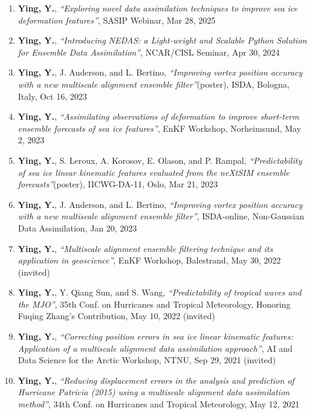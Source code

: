 \begin{enumerate}
\item \textbf{Ying, Y.},
\textit{``Exploring novel data assimilation techniques to improve sea ice deformation features''},
SASIP Webinar, Mar 28, 2025

\item \textbf{Ying, Y.},
\textit{``Introducing NEDAS: a Light-weight and Scalable Python Solution for Ensemble Data Assimilation''},
NCAR/CISL Seminar, Apr 30, 2024

\item \textbf{Ying, Y.}, J. Anderson, and L. Bertino,
\textit{``Improving vortex position accuracy with a new multiscale alignment ensemble filter''}(poster),
ISDA, Bologna, Italy, Oct 16, 2023

\item \textbf{Ying, Y.},
\textit{``Assimilating observations of deformation to improve short-term ensemble forecasts of sea ice features''},
EnKF Workshop, Norheimsund, May 2, 2023

\item \textbf{Ying, Y.}, S. Leroux, A. Korosov, E. Olason, and P. Rampal,
\textit{``Predictability of sea ice linear kinematic features evaluated from the neXtSIM ensemble forecasts''}(poster),
IICWG-DA-11, Oslo, Mar 21, 2023

\item \textbf{Ying, Y.}, J. Anderson, and L. Bertino,
\textit{``Improving vortex position accuracy with a new multiscale alignment ensemble filter''},
ISDA-online, Non-Gaussian Data Assimilation, Jan 20, 2023

\item \textbf{Ying, Y.},
\textit{``Multiscale alignment ensemble filtering technique and its application in geoscience''},
EnKF Workshop, Balestrand, May 30, 2022
(invited)

\item \textbf{Ying, Y.}, Y. Qiang Sun, and S. Wang,
\textit{``Predictability of tropical waves and the MJO''},
35th Conf. on Hurricanes and Tropical Meteorology, Honoring Fuqing Zhang’s Contribution, May 10, 2022
(invited)

\item \textbf{Ying, Y.},
\textit{``Correcting position errors in sea ice linear kinematic features: Application of a multiscale alignment data assimilation approach''},
AI and Data Science for the Arctic Workshop, NTNU, Sep 29, 2021
(invited)

\item \textbf{Ying, Y.},
\textit{``Reducing displacement errors in the analysis and prediction of Hurricane Patricia (2015) using a multiscale alignment data assimilation method''},
34th Conf. on Hurricanes and Tropical Meteorology, May 12, 2021


\end{enumerate}
